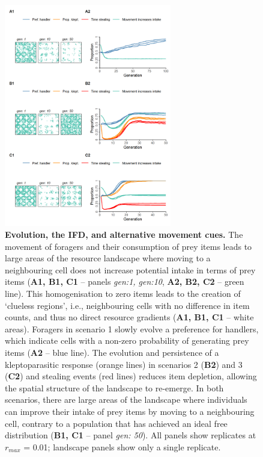 \documentclass[11pt]{article}
\begin{document}
\begin{figure}[h!]
    \centering
    \includegraphics[width=0.65\textwidth]{figures/fig_05.png}
    \caption{
        \textbf{Evolution, the IFD, and alternative movement cues.}
        The movement of foragers and their consumption of prey items leads to large areas of the resource landscape where moving to a neighbouring cell does not increase potential intake in terms of prey items (\textbf{A1, B1, C1} -- panels \textit{gen:1, gen:10}, \textbf{A2, B2, C2} -- green line).
        This homogenisation to zero items leads to the creation of `clueless regions', i.e., neighbouring cells with no difference in item counts, and thus no direct resource gradients (\textbf{A1, B1, C1} -- white areas).
        Foragers in scenario 1 slowly evolve a preference for handlers, which indicate cells with a non-zero probability of generating prey items (\textbf{A2} -- blue line).
        The evolution and persistence of a kleptoparasitic response (orange lines) in scenarios 2 (\textbf{B2}) and 3 (\textbf{C2}) and stealing events (red lines) reduces item depletion, allowing the spatial structure of the landscape to re-emerge.
        In both scenarios, there are large areas of the landscape where individuals can improve their intake of prey items by moving to a neighbouring cell, contrary to a population that has achieved an ideal free distribution (\textbf{B1, C1} -- panel \textit{gen: 50}).
        All panels show replicates at $r_{max}$ = 0.01; landscape panels show only a single replicate.
    }
    \label{Fig:CluelessLandscape}
\end{figure}
\end{document}
